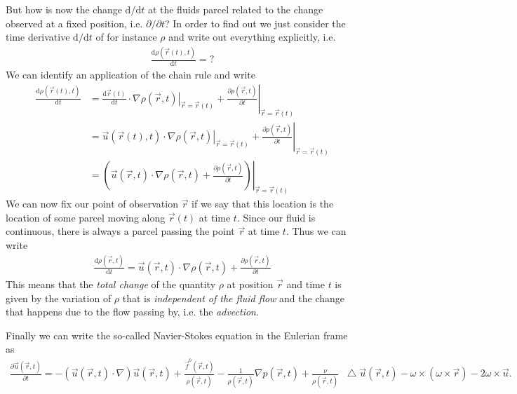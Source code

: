 \documentclass[10pt,a4paper]{article}
\newcommand*\Laplace{\mathop{}\!\mathbin\bigtriangleup}
\renewcommand{\d}{\mathrm{d}}
\begin{document}
But how is now the change $\d / \d t$ at the fluids parcel related to the change observed at a fixed position, i.e. $\partial / \partial t$?
%
In order to find out we just consider the time derivative $\d / \d t$ of for instance $\rho$ and write out everything explicitly, i.e.
%
\begin{align}
\frac{\d \rho(\vec{r}(t), t)}{\d t} = ?
\end{align}
%
We can identify an application of the chain rule and write
%
\begin{align}
\frac{\d \rho(\vec{r}(t), t)}{\d t} & = \frac{\d \vec{r}(t)}{\d t} \cdot \left . \nabla \rho(\vec{r}, t)\right |_{\vec{r} = \vec{r}(t)} + \left .\frac{\partial \rho(\vec{r}, t)}{ \partial t} \right |_{\vec{r} = \vec{r}(t)} \\
& = \vec{u}(\vec{r}(t),t) \cdot \left . \nabla \rho(\vec{r}, t)\right |_{\vec{r} = \vec{r}(t)} + \left .\frac{\partial \rho(\vec{r}, t)}{ \partial t} \right |_{\vec{r} = \vec{r}(t)} \\
& = \left . \left(  \vec{u}(\vec{r},t) \cdot  \nabla \rho(\vec{r}, t) + \frac{\partial \rho(\vec{r}, t)}{ \partial t} \right) \right |_{\vec{r} = \vec{r}(t)}
\end{align}
%
We can now fix our point of observation $\vec{r}$ if we say that this location is the location of some parcel moving along $\vec{r}(t)$ at time $t$.
%
Since our fluid is continuous, there is always a parcel passing the point $\vec{r}$ at time $t$.
%
Thus we can write
%
\begin{align}
\frac{\d \rho(\vec{r}, t)}{\d t} = \vec{u}(\vec{r},t) \cdot  \nabla \rho(\vec{r}, t) + \frac{\partial \rho(\vec{r}, t)}{ \partial t}
\end{align}
%
This means that the \textit{total change} of the quantity $\rho$ at position $\vec{r}$ and time $t$ is given by the variation of $\rho$ that is \textit{independent of the fluid flow} and the change that happens due to the flow passing by, i.e. the \textit{advection}.

Finally we can write the so-called Navier-Stokes equation in the Eulerian frame as
%
\begin{align}
\boxed{
 \frac{\partial \vec{u}(\vec{r},t)}{\partial t} = - (\vec{u}(\vec{r}, t)\cdot \nabla) \vec{u}(\vec{r}, t) +  \frac{\vec{f}^b(\vec{r},t)}{\rho(\vec{r},t)} -\frac{1}{\rho(\vec{r},t)} \nabla p(\vec{r}, t)+ \frac{\nu}{\rho(\vec{r}, t)} \Laplace \vec{u}(\vec{r}, t) -  \omega \times (\omega \times \vec{r}) - 2 \omega \times \vec{u} 
}.
\end{align}
%
\end{document}
